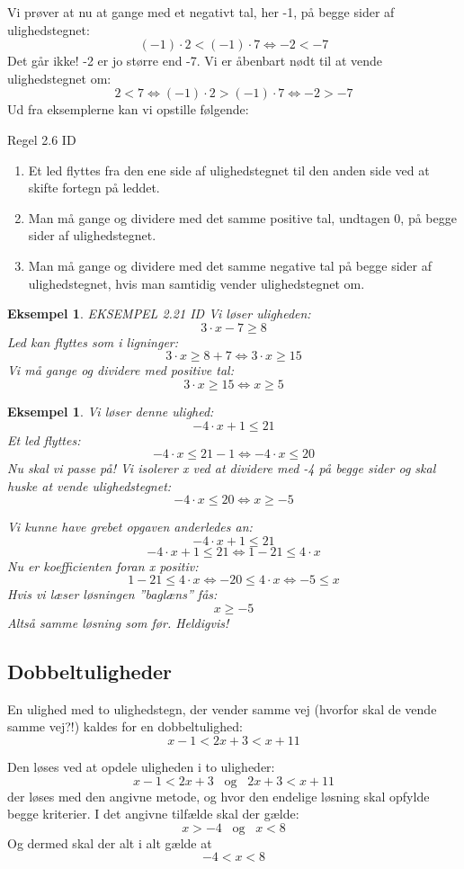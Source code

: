 \documentclass[12pt,oneside,a4paper]{article}
\newtheorem{eks}[thm]{Eksempel}
\begin{document}
Vi prøver at nu at gange med et negativt tal, her -1, på begge sider af ulighedstegnet:
$$
(-1) \cdot 2 < (-1) \cdot 7 \Leftrightarrow -2<-7
$$
Det går ikke! -2 er jo større end -7. Vi er åbenbart nødt til at vende ulighedstegnet om:
$$
2<7 \Leftrightarrow (-1) \cdot 2 > (-1) \cdot 7 \Leftrightarrow -2>-7
$$
Ud fra eksemplerne kan vi opstille følgende:

Regel 2.6 ID
\begin{enumerate}
    \item Et led flyttes fra den ene side af ulighedstegnet til den anden side ved at skifte fortegn på leddet.
    \item Man må gange og dividere med det samme positive tal, undtagen 0, på begge sider af ulighedstegnet.
    \item Man må gange og dividere med det samme negative tal på begge sider af ulighedstegnet, hvis man samtidig vender ulighedstegnet om.
\end{enumerate}

\begin{eks}
EKSEMPEL 2.21 ID
Vi løser uligheden:
$$
3 \cdot x - 7 \geq 8
$$
Led kan flyttes som i ligninger:
$$
3 \cdot x \geq 8+7 \Leftrightarrow 3 \cdot x \geq 15
$$
Vi må gange og dividere med positive tal:
$$
3 \cdot x \geq 15 \Leftrightarrow x \geq 5
$$
\end{eks}

\begin{eks}
Vi løser denne ulighed:
$$
-4 \cdot x + 1 \leq 21
$$
Et led flyttes:
$$
-4 \cdot x \leq 21 -1 \Leftrightarrow -4 \cdot x \leq 20
$$
Nu skal vi passe på! Vi isolerer x ved at dividere med -4 på begge sider og skal huske at vende ulighedstegnet:
$$
-4 \cdot x \leq 20 \Leftrightarrow x \geq-5
$$

Vi kunne have grebet opgaven anderledes an:
$$
-4 \cdot x + 1 \leq 21
$$
$$
-4 \cdot x + 1 \leq 21 \Leftrightarrow 1 - 21 \leq 4 \cdot x
$$
Nu er koefficienten foran x positiv:
$$
1-21 \leq 4 \cdot x \Leftrightarrow -20 \leq 4 \cdot x \Leftrightarrow -5 \leq x
$$
Hvis vi læser løsningen ”baglæns” fås:
$$
x \geq -5
$$
Altså samme løsning som før. Heldigvis!
\end{eks}

\subsection{Dobbeltuligheder}
En ulighed med to ulighedstegn, der vender samme vej (hvorfor skal de vende samme vej?!) kaldes for en dobbeltulighed:
$$
x-1 < 2x + 3 < x+11
$$

Den løses ved at opdele uligheden i to uligheder:
$$
x - 1 < 2x + 3 \;\;\; \text{og} \;\;\; 2x + 3 < x + 11
$$
der løses med den angivne metode, og hvor den endelige løsning skal opfylde begge kriterier. I det angivne tilfælde skal der gælde:
$$
x>-4 \;\;\; \text{og} \;\;\; x<8
$$
Og dermed skal der alt i alt gælde at
$$
-4 < x < 8
$$
\end{document}
